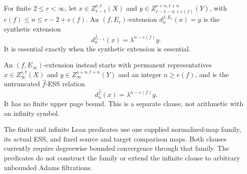 \begin{definition}[$(f,E_r)$-extension]
  \label{def:page-extension}
  \notready
  For finite $2\le r<\infty$, let $x\in Z_{r-1}^{s,t}(X)$ and
  $y\in Z_{r-1-n+e(f)}^{s+n,t+n}(Y)$, with
  $e(f)\le n\le r-2+e(f)$.  An $(f,E_r)$-extension
  $d_n^{f,E_r}(x)=y$ is the synthetic extension
  \[
    d_n^{\widehat f_{r-1}}(x)=\lambda^{n-e(f)}y.
  \]
  It is essential exactly when the synthetic extension is essential.

  An $(f,E_\infty)$-extension instead starts with permanent representatives
  $x\in Z_\infty^{s,t}(X)$ and
  $y\in Z_\infty^{s+n,t+n}(Y)$ and an integer $n\ge e(f)$, and is the
  untruncated $\widehat f$-ESS relation
  \[
    d_n^{\widehat f}(x)=\lambda^{n-e(f)}y.
  \]
  It has no finite upper page bound.  This is a separate clause, not arithmetic
  with an infinity symbol.

  The finite and infinite Lean predicates use one supplied normalized-map
  family, its actual ESS, and fixed source and target comparison maps.  Both
  clauses currently require degreewise bounded convergence through that
  family.  The predicates do not construct the family or extend the infinite
  clause to arbitrary unbounded Adams filtrations.
\end{definition}

